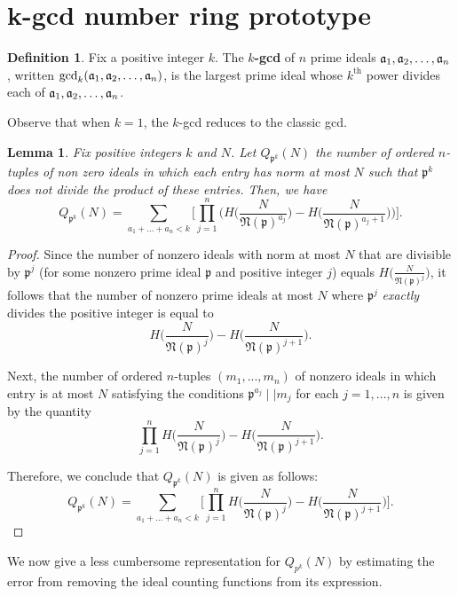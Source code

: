 \documentclass[10pt,a4paper]{article}
\newtheorem{lemma}[theorem]{Lemma}
\theoremstyle{definition}
\newtheorem{definition}{Definition}[section]
\theoremstyle{remark}
\newcommand{\f}[1]{\mathfrak{#1}}
\begin{document}
\section{k-gcd number ring prototype}

\begin{definition} Fix a positive integer $k$. The \textbf{$k$-gcd} of $n$ prime ideals $\f{a}_1, \f{a}_2,\mathellipsis, \f{a}_n$, written $\gcd_k(\f{a}_1,\f{a}_2, \mathellipsis,\f{a}_n)$, is the largest prime ideal whose $k^{\text{th}}$ power divides each of $\f{a}_1, \f{a}_2,\mathellipsis, \f{a}_n$.
\end{definition}	

\noindent Observe that when $k=1$, the $k$-gcd reduces to the classic gcd.

\begin{lemma}
	Fix positive integers $k$ and $N$. Let $Q_{\f{p}^k}(N)$ the number of ordered $n$-tuples of non zero ideals in which each entry has norm at most $N$ such that $\f{p}^k$ does not divide the product of these entries. Then, we have
	$$Q_{\f{p}^k}(N) = \sum_{a_1+...+a_n < k} \Big[\prod_{j=1}^n \Big(H\bigg( \frac{N}{\f{N}(\f{p})^{a_j}}\bigg) - H\bigg(\frac{N}{\f{N}(\f{p})^{a_j + 1}}\bigg)\Big)\Big].$$
\end{lemma}

\begin{proof}
	Since the number of nonzero ideals with norm at most $N$ that are divisible by $\f{p}^j$ (for some nonzero prime ideal $\f{p}$ and positive integer $j$) equals $H\big(\frac{N}{\f{N}(\f{p})^j}\big)$, it follows that the number of nonzero prime ideals at most $N$ where $\f{p}^j$ \textit{exactly} divides the positive integer is equal to
	$$H\bigg(\frac{N}{\f{N}(\f{p})^j}\bigg) - H\bigg(\frac{N}{\f{N}(\f{p})^{j+1}}\bigg).$$
	
	\noindent Next, the number of ordered $n$-tuples $(m_1, ..., m_n)$ of nonzero ideals in which entry is at most $N$ satisfying the conditions $\f{p}^{a_j} \mid\mid m_j$ for each $j = 1, ..., n$ is given by the quantity
	$$\prod_{j=1}^n H\bigg(\frac{N}{\f{N}(\f{p})^j}\bigg) - H\bigg(\frac{N}{\f{N}(\f{p})^{j+1}}\bigg).$$
	
	\noindent Therefore, we conclude that $Q_{\f{p}^k}(N)$ is given as follows:
	$$Q_{\f{p}^k}(N) = \sum_{a_1+...+a_n < k} \bigg[\prod_{j=1}^n H\bigg(\frac{N}{\f{N}(\f{p})^j}\bigg) - H\bigg(\frac{N}{\f{N}(\f{p})^{j+1}}\bigg)\bigg].$$ 
\end{proof}

We now give a less cumbersome representation for $Q_{p^k}(N)$ by estimating the error from removing the ideal counting functions from its expression.
\end{document}
